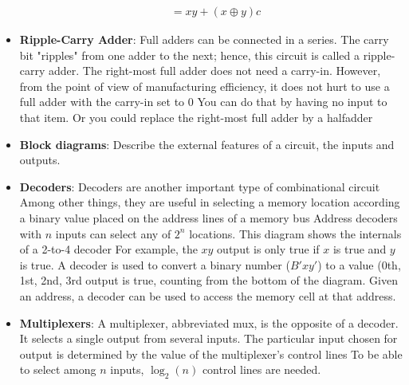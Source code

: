 \documentclass{report}
\begin{document}
\begin{itemize}
\begin{align*}
                &=xy + (x \oplus y)c
            \end{align*}
        \item \textbf{Ripple-Carry Adder}: 
            Full adders can be connected in a series. The carry bit "ripples" from one adder to the next; hence, this circuit is called a ripple-carry adder.
            \bigbreak \noindent 
            \bigbreak \noindent 
            The right-most full adder does not need a carry-in. However, from the point of view of manufacturing efficiency, it does not hurt to use a full adder with the carry-in set to 0
            \bigbreak \noindent 
            You can do that by having no input to that item. Or you could replace the right-most full adder by a halfadder
        \item \textbf{Block diagrams}: Describe the external features of a circuit, the inputs and outputs.
        \item \textbf{Decoders}:
            Decoders are another important type of combinational circuit
            \bigbreak \noindent 
            Among other things, they are useful in selecting a memory location according a binary value placed on the address lines of a memory bus
            \bigbreak \noindent 
            Address decoders with $n$ inputs can select any of $2^{n}$ locations.
            \bigbreak \noindent 
            \bigbreak \noindent 
            This diagram shows the internals of a 2-to-4 decoder
            \bigbreak \noindent 
            \bigbreak \noindent 
            For example, the $xy$ output is only true if $x$ is true and $y$ is true.
            \bigbreak \noindent 
            A decoder is used to convert a binary number ($B'xy'$) to a value (0th, 1st, 2nd, 3rd output is true, counting from the bottom of the diagram.
            \bigbreak \noindent 
            Given an address, a decoder can be used to access the memory cell at that address.
        \item \textbf{Multiplexers}: A multiplexer, abbreviated mux, is the opposite of a decoder. It selects a single output from several inputs. The particular input chosen for output is determined by the value of the multiplexer's control lines
            \bigbreak \noindent 
            To be able to select among $n$ inputs, $\log_{2}(n) $ control lines are needed.
            \bigbreak \noindent 

\end{itemize}
\end{document}
